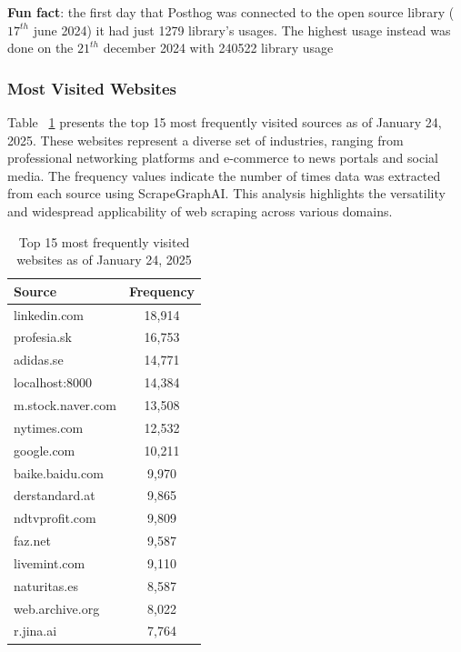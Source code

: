 \textbf{Fun fact}: the first day that Posthog was connected to the open source library ($17^{th}$ june 2024) it had just 1279 library's usages. The highest usage instead was done on the $21^{th}$ december 2024 with 240522 library usage

\subsubsection{Most Visited Websites}

Table ~\ref{tab:most-visited-websites} presents the top 15 most frequently visited sources as of January 24, 2025. These websites represent a diverse set of industries, ranging from professional networking platforms and e-commerce to news portals and social media. The frequency values indicate the number of times data was extracted from each source using ScrapeGraphAI. This analysis highlights the versatility and widespread applicability of web scraping across various domains.

\begin{table}[h!]
\centering
\begin{tabular}{|l|c|}
\hline
\textbf{Source}              & \textbf{Frequency} \\ \hline
linkedin.com                 & 18,914             \\ \hline
profesia.sk                  & 16,753             \\ \hline
adidas.se                    & 14,771             \\ \hline
localhost:8000               & 14,384             \\ \hline
m.stock.naver.com            & 13,508             \\ \hline
nytimes.com                  & 12,532             \\ \hline
google.com                   & 10,211             \\ \hline
baike.baidu.com              & 9,970              \\ \hline
derstandard.at               & 9,865              \\ \hline
ndtvprofit.com               & 9,809              \\ \hline
faz.net                      & 9,587              \\ \hline
livemint.com                 & 9,110              \\ \hline
naturitas.es                 & 8,587              \\ \hline
web.archive.org              & 8,022              \\ \hline
r.jina.ai                    & 7,764              \\ \hline
\end{tabular}
\caption{Top 15 most frequently visited websites as of January 24, 2025}
\label{tab:most-visited-websites}
\end{table}

